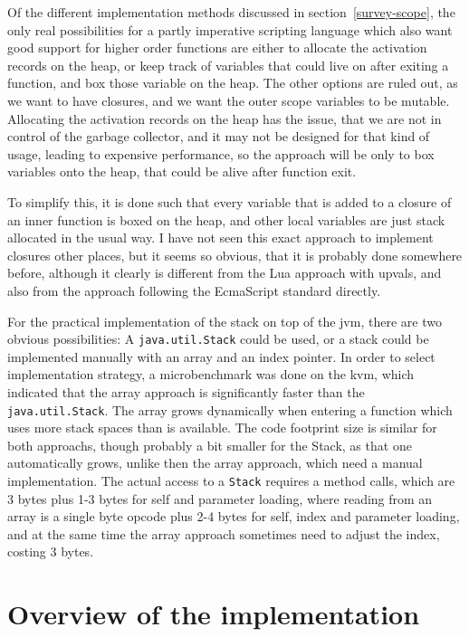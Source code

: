 \documentclass[11pt]{report}
\begin{document}
Of the different implementation methods discussed in section~\ref{survey-scope}, the only real possibilities for a partly imperative scripting language which also want good support for higher order functions are either to allocate the activation records on the heap, or keep track of variables that could live on after exiting a function, and box those variable on the heap.
The other options are ruled out, as we want to have closures, and we want the outer scope variables to be mutable.
Allocating the activation records on the heap has the issue, that we are not in control of the garbage collector, and it may not be designed for that kind of usage, leading to expensive performance, so the approach will be only to box variables onto the heap, that could be alive after function exit.

To simplify this, it is done such that every variable that is added to a closure of an inner function is boxed on the heap, and other local variables are just stack allocated in the usual way. 
I have not seen this exact approach to implement closures other places, but it seems so obvious, that it is probably done somewhere before, although it clearly is different from the Lua approach with upvals\cite{luasrc}, and also from the approach following the EcmaScript standard\cite{ecmascript} directly.

For the practical implementation of the stack on top of the jvm, there are two obvious possibilities: A \verb|java.util.Stack| could be used, or a stack could be implemented manually with an array and an index pointer. 
In order to select implementation strategy, a microbenchmark was done on the kvm, which indicated that the array approach is significantly faster than the \verb|java.util.Stack|. The array grows dynamically when entering a function which uses more stack spaces than is available. 
The code footprint size is similar for both approachs, though probably a bit smaller for the Stack, as that one automatically grows, unlike then the array approach, which need a manual implementation.
The actual access to a \verb|Stack| requires a method calls, which are 3 bytes plus 1-3 bytes for self and parameter loading, where reading from an array is a single byte opcode plus 2-4 bytes for self, index and parameter loading, and at the same time the array approach sometimes need to adjust the index, costing 3 bytes.

\section{Overview of the implementation}
\end{document}
